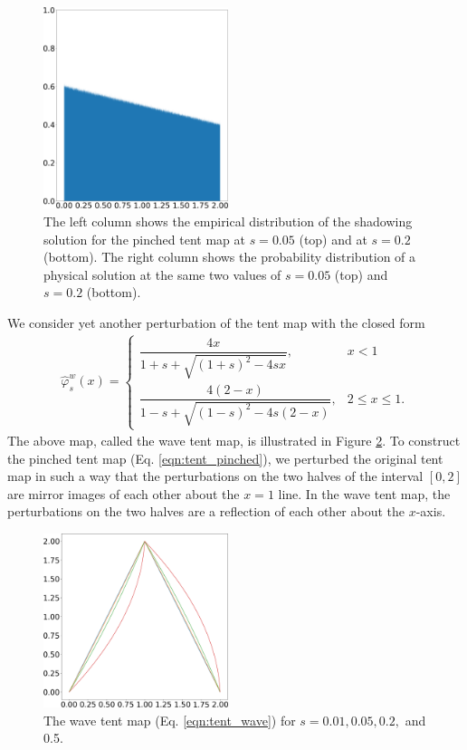 \begin{figure}
    \includegraphics[width=0.48\textwidth]{figure/tent_pinched_physical_density_0.2.png}
    \caption{The left column shows the empirical distribution of the shadowing solution for the pinched tent map at $s=0.05$ (top) and at $s=0.2$ (bottom). The right column shows the probability distribution of a physical solution at the same two values of $s = 0.05$ (top) and $s = 0.2$ (bottom).}
    \label{fig:tent_pinched_shadow}
\end{figure}
We consider yet another perturbation of the tent map with the closed form
\begin{align}
\hat{\varphi}^w_s(x) = \begin{cases}
        \dfrac{4x}{1 + s + \sqrt{(1+s)^2 - 4s x} }, & x < 1 \\
        \dfrac{4(2-x)}{1 - s + \sqrt{(1-s)^2 - 4s(2- x)} }, & 2 \leq x \leq 1.
    \end{cases}
    \label{eqn:tent_wave}
\end{align}
The above map, called the wave tent map, is illustrated in Figure \ref{fig:tent_wave}.
To construct the pinched tent map (Eq. \ref{eqn:tent_pinched}), we perturbed the original tent map in such a way that the perturbations on the two halves of the interval $[0,2]$ are mirror images of each other about the $x=1$ line. In the wave tent map, the perturbations on the two halves are a reflection of each other about the 
$x$-axis.
\begin{figure}
    \centering
    \includegraphics[width=0.48\textwidth]{figure/wave_tent_map.png}
    \caption{The wave tent map (Eq. \ref{eqn:tent_wave}) for $s = 0.01, 0.05, 0.2,$ and 0.5.}
    \label{fig:tent_wave}
\end{figure}
